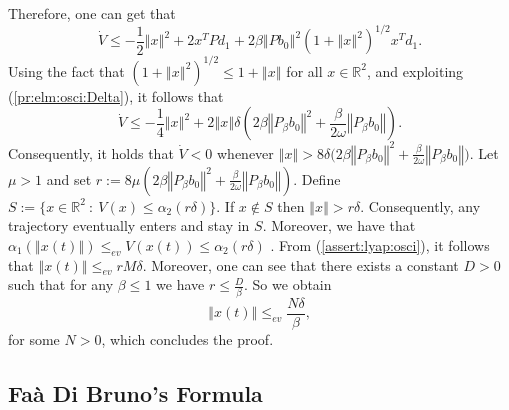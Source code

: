 \documentclass[letterpaper, 10pt]{article}
\newcommand{\rref}[1]{(\ref{#1})}
\newcommand{\norme}[1]{\left\Vert #1\right\Vert}
\newcommand{\reels}{\mathbb{R}}
\begin{document}
Therefore, one can get that
\begin{equation*}
\dot{V} \leq  - \frac{ 1}{2} \norme{x}^2  + 2  x^T P d_1 + 2 \beta \norme{Pb_0}^2 (1+ \norme{x}^2)^{1/2}   x^T d_1 .
\end{equation*}
Using the fact that $(1+ \norme{x}^2)^{1/2} \leq 1 + \norme{x}$ for all $x \in \reels^2$, and exploiting \rref{pr:elm:osci:Delta}, it follows that
\begin{equation*}
\dot{V} \leq  - \frac{ 1}{4} \norme{x}^2  +  2 \norme{x} \delta \left( 2 \beta \norme{P_{\beta} b_0}^2 + \frac{\beta }{2 \omega } \norme{P_{\beta} b_0} \right).
\end{equation*} 
Consequently, it holds that $\dot{V}  < 0 $ whenever $\norme{x} >  8 \delta  \big( 2\beta \norme{P_{\beta} b_0}^2 + \frac{\beta }{2 \omega } \norme{P_{\beta} b_0} \big)   $. Let $\mu > 1$ and set $r := 8 \mu  ( 2 \beta \norme{P_{\beta} b_0}^2 + \frac{\beta }{2 \omega } \norme{P_{\beta} b_0})  $. Define $S:=\lbrace x \in \reels^2 \: : \:  V(x) \leq \alpha_2 (r \delta ) \rbrace$.  If $x \notin S$ then $\norme{x} > r \delta $. Consequently, any trajectory eventually enters and stay in $S$. Moreover, we have that $\alpha_1( \norme{x(t)} ) \leq_{ev} V(x(t)) \leq \alpha_2(r \delta )$ . From \rref{assert:lyap:osci}, it follows that $\norme{x(t)} \leq_{ev} rM \delta $. Moreover, one can see that there exists a constant $D>0 $ such that for any $\beta \leq 1$ we have $r \leq \frac{D}{\beta}$. So we obtain 
\begin{equation*}
 \norme{x(t)} \leq_{ev} \frac{N \delta}{\beta}, 
\end{equation*} for some $N>0$, which concludes the proof.


\subsection{Fa\`a Di Bruno's Formula}
\end{document}
